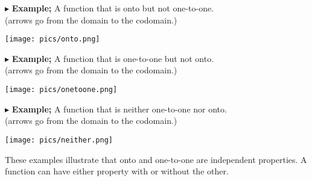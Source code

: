 \documentclass{ximera}
\begin{document}
$\blacktriangleright$ \textbf{Example;} A function that is onto but not one-to-one.  \\
(arrows go from the domain to the codomain.)

\begin{image}
\texttt{[image: pics/onto.png]}
\end{image}








$\blacktriangleright$ \textbf{Example;} A function that is one-to-one but not onto.  \\
(arrows go from the domain to the codomain.)

\begin{image}
\texttt{[image: pics/onetoone.png]}
\end{image}







$\blacktriangleright$ \textbf{Example;} A function that is neither one-to-one nor onto.  \\
(arrows go from the domain to the codomain.)

\begin{image}
\texttt{[image: pics/neither.png]}
\end{image}





These examples illustrate that onto and one-to-one are independent properties.  A function can have either property with or without the other.
\end{document}
